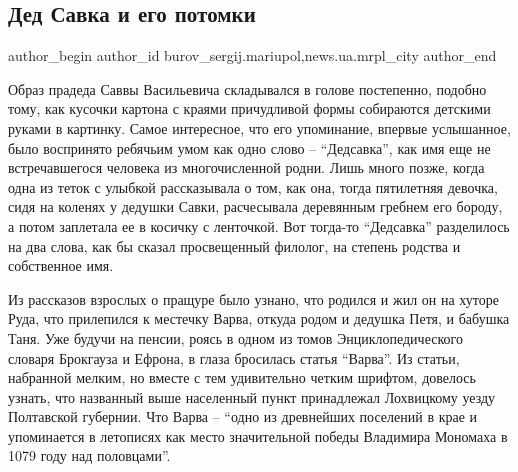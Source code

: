  
 
 
 
 
 
\subsection{Дед Савка и его потомки}
\label{sec:29_07_2017.stz.news.ua.mrpl_city.1.ded_savka_i_ego_potomki}
 
\ifcmt
 author_begin
   author_id burov_sergij.mariupol,news.ua.mrpl_city
 author_end
\fi

Образ прадеда Саввы Васильевича складывался в голове постепенно, подобно тому,
как кусочки картона с краями причудливой формы собираются детскими руками в
картинку. Самое интересное, что его упоминание, впервые услышанное, было
воспринято ребячьим умом как одно слово – \enquote{Дедсавка}, как имя еще не
встречавшегося человека из многочисленной родни. Лишь много позже, когда одна
из теток с улыбкой рассказывала о том, как она, тогда пятилетняя девочка, сидя
на коленях у дедушки Савки, расчесывала деревянным гребнем его бороду, а потом
заплетала ее в косичку с ленточкой. Вот тогда-то \enquote{Дедсавка} разделилось на два
слова, как бы сказал просвещенный филолог, на степень родства и собственное
имя.

Из рассказов взрослых о пращуре было узнано, что родился и жил он на хуторе
Руда, что прилепился к местечку Варва, откуда родом и дедушка Петя, и бабушка
Таня. Уже будучи на пенсии, роясь в одном из томов Энциклопедического словаря
Брокгауза и Ефрона, в глаза бросилась статья \enquote{Варва}. Из статьи, набранной
мелким, но вместе с тем удивительно четким шрифтом, довелось узнать, что
названный выше населенный пункт принадлежал Лохвицкому уезду Полтавской
губернии. Что Варва – \enquote{одно из древнейших поселений в крае и упоминается в
летописях как место значительной победы Владимира Мономаха  в 1079 году над
половцами}.

